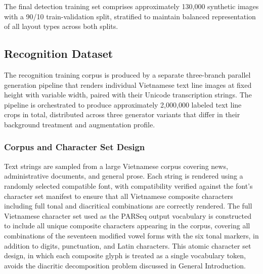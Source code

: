 \vspace{4em}

The final detection training set comprises approximately 130,000 synthetic images with a 90/10 train-validation split, stratified to maintain balanced representation of all layout types across both splits.

\subsection{Recognition Dataset}
The recognition training corpus is produced by a separate three-branch parallel generation pipeline that renders individual Vietnamese text line images at fixed height with variable width, paired with their Unicode transcription strings. The pipeline is orchestrated to produce approximately 2,000,000 labeled text line crops in total, distributed across three generator variants that differ in their background treatment and augmentation profile.

\subsubsection{Corpus and Character Set Design}
Text strings are sampled from a large Vietnamese corpus covering news, administrative documents, and general prose. Each string is rendered using a randomly selected compatible font, with compatibility verified against the font's character set manifest to ensure that all Vietnamese composite characters including full tonal and diacritical combinations are correctly rendered. The full Vietnamese character set used as the PARSeq output vocabulary is constructed to include all unique composite characters appearing in the corpus, covering all combinations of the seventeen modified vowel forms with the six tonal markers, in addition to digits, punctuation, and Latin characters. This atomic character set design, in which each composite glyph is treated as a single vocabulary token, avoids the diacritic decomposition problem discussed in General Introduction.

